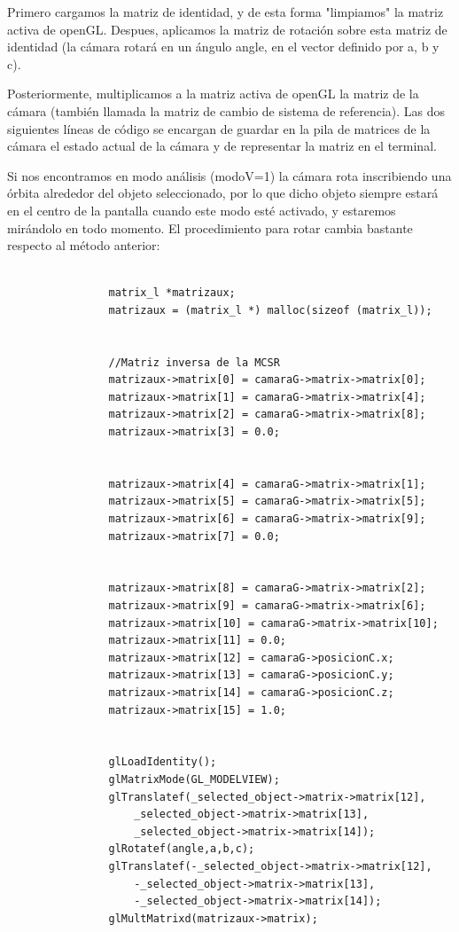 \documentclass[12pt,a4paper]{article}
\begin{document}
\begin{enumerate}
\begin{enumerate}
\begin{enumerate}
Primero cargamos la matriz de identidad, y de esta forma "limpiamos" la matriz activa de openGL. Despues, aplicamos la matriz de rotación sobre esta matriz de identidad (la cámara rotará en un ángulo angle, en el vector definido por a, b y c).

Posteriormente, multiplicamos a la matriz activa de openGL la matriz de la cámara (también llamada la matriz de cambio de sistema de referencia).
Las dos siguientes líneas de código se encargan de guardar en la pila de matrices de la cámara el estado actual de la cámara y de representar la matriz en el terminal.
\newline

Si nos encontramos en modo análisis (modoV=1) la cámara rota inscribiendo una órbita alrededor del objeto seleccionado, por lo que dicho objeto siempre estará en el centro de la pantalla cuando este modo esté activado, y estaremos mirándolo en todo momento. El procedimiento para rotar cambia bastante respecto al método anterior:
\begin{lstlisting}

            	matrix_l *matrizaux;
        		matrizaux = (matrix_l *) malloc(sizeof (matrix_l));
        		

        		//Matriz inversa de la MCSR
        		matrizaux->matrix[0] = camaraG->matrix->matrix[0];
				matrizaux->matrix[1] = camaraG->matrix->matrix[4];
				matrizaux->matrix[2] = camaraG->matrix->matrix[8];	
				matrizaux->matrix[3] = 0.0;

	
				matrizaux->matrix[4] = camaraG->matrix->matrix[1];
				matrizaux->matrix[5] = camaraG->matrix->matrix[5];	
				matrizaux->matrix[6] = camaraG->matrix->matrix[9];	
				matrizaux->matrix[7] = 0.0;
	
	
				matrizaux->matrix[8] = camaraG->matrix->matrix[2];	
				matrizaux->matrix[9] = camaraG->matrix->matrix[6];
				matrizaux->matrix[10] = camaraG->matrix->matrix[10];
				matrizaux->matrix[11] = 0.0;
				matrizaux->matrix[12] = camaraG->posicionC.x;
        		matrizaux->matrix[13] = camaraG->posicionC.y;
        		matrizaux->matrix[14] = camaraG->posicionC.z;
				matrizaux->matrix[15] = 1.0;
				
				
        		glLoadIdentity();
        		glMatrixMode(GL_MODELVIEW);
        		glTranslatef(_selected_object->matrix->matrix[12],
		    		_selected_object->matrix->matrix[13],
		    		_selected_object->matrix->matrix[14]);
		     	glRotatef(angle,a,b,c);
        		glTranslatef(-_selected_object->matrix->matrix[12],
		    		-_selected_object->matrix->matrix[13],
		    		-_selected_object->matrix->matrix[14]);
        		glMultMatrixd(matrizaux->matrix);
     			

\end{lstlisting}
\end{enumerate}
\end{enumerate}
\end{enumerate}
\end{document}

